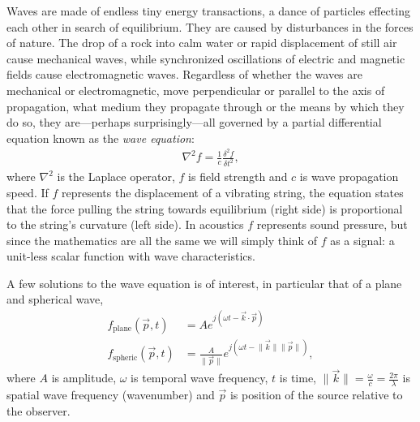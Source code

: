 {Waves are made of endless tiny energy transactions, a dance of particles effecting each other in search of equilibrium. They are caused by disturbances in the forces of nature. The drop of a rock into calm water or rapid displacement of still air cause mechanical waves, while synchronized oscillations of electric and magnetic fields cause electromagnetic waves. Regardless of whether the waves are mechanical or electromagnetic, move perpendicular or parallel to the axis of propagation, what medium they propagate through or the means by which they do so, they are---perhaps surprisingly---all governed by a partial differential equation known as the \emph{wave equation}:
%
\begin{align}
\nabla^2 f 
 = \frac{1}{c}\frac{\delta^2 f}{\delta t^2},
\end{align}
%
where $\nabla^2$ is the Laplace operator, $f$ is field strength and $c$ is wave propagation speed. If $f$ represents the displacement of a vibrating string, the equation states that the force pulling the string towards equilibrium (right side) is proportional to the string's curvature (left side). In acoustics $f$ represents sound pressure, but since the mathematics are all the same we will simply think of $f$ as a signal: a unit-less scalar function with wave characteristics.

A few solutions to the wave equation is of interest, in particular that of a plane and spherical wave,
%
\begin{align}
f_\textrm{plane}(\vec{p},t)  &= A e^{j(\omega t - \vec{k} \cdot \vec{p})} \\
f_\textrm{spheric}(\vec{p},t) &= \frac{A}{\lVert \vec{p} \rVert} e^{j(\omega t - \lVert\vec{k}\rVert \lVert \vec{p} \rVert)},
\end{align}
% 
where $A$ is amplitude, $\omega$ is temporal wave frequency, $t$ is time, $\lVert\vec{k}\rVert=\frac{\omega}{c}=\frac{2\pi}{\lambda}$ is spatial wave frequency (wavenumber) and $\vec{p}$ is position of the source relative to the observer. 

% 
% 
% 


}
